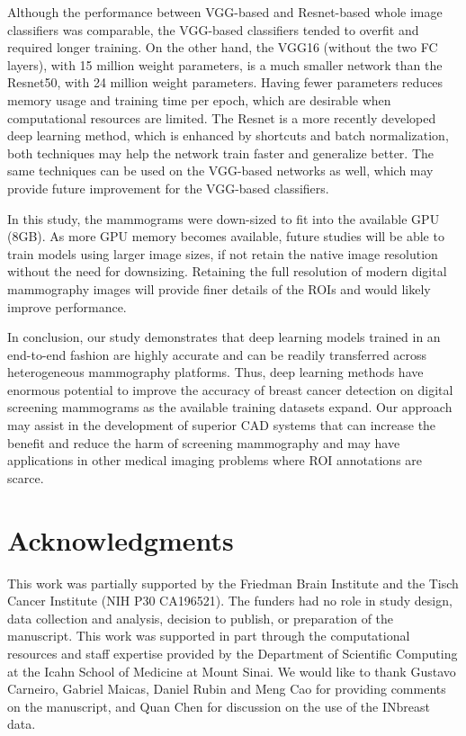 \documentclass[12pt,letterpaper]{article}
\begin{document}
Although the performance between VGG-based and Resnet-based whole image classifiers was comparable, the VGG-based classifiers tended to overfit and required longer training. On the other hand, the VGG16 (without the two FC layers), with 15 million weight parameters, is a much smaller network than the Resnet50, with 24 million weight parameters. Having fewer parameters reduces memory usage and training time per epoch, which are desirable when computational resources are limited. The Resnet is a more recently developed deep learning method, which is enhanced by shortcuts and batch normalization, both techniques may help the network train faster and generalize better. The same techniques can be used on the VGG-based networks as well, which may provide future improvement for the VGG-based classifiers.

In this study, the mammograms were down-sized to fit into the available GPU (8GB). As more GPU memory becomes available, future studies will be able to train models using larger image sizes, if not retain the native image resolution without the need for downsizing. Retaining the full resolution of modern digital mammography images will provide finer details of the ROIs and would likely improve performance. 

In conclusion, our study demonstrates that deep learning models trained in an end-to-end fashion are highly accurate and can be readily transferred across heterogeneous mammography platforms. Thus, deep learning methods have enormous potential to improve the accuracy of breast cancer detection on digital screening mammograms as the available training datasets expand. Our approach may assist in the development of superior CAD systems that can increase the benefit and reduce the harm of screening mammography and may have applications in other medical imaging problems where ROI annotations are scarce.

\section*{Acknowledgments}
This work was partially supported by the Friedman Brain Institute and the Tisch Cancer Institute (NIH P30 CA196521). The funders had no role in study design, data collection and analysis, decision to publish, or preparation of the manuscript. This work was supported in part through the computational resources and staff expertise provided by the Department of Scientific Computing at the Icahn School of Medicine at Mount Sinai. We would like to thank Gustavo Carneiro, Gabriel Maicas, Daniel Rubin and Meng Cao for providing comments on the manuscript, and Quan Chen for discussion on the use of the INbreast data.
\end{document}
